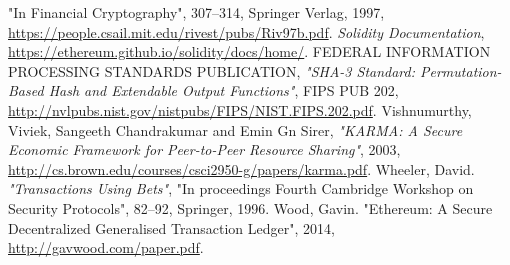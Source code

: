\documentclass[a4paper]{article}
\begin{document}
\begin{thebibliography}{9}
    "In Financial Cryptography", 307--314, Springer Verlag, 1997,
    \url{https://people.csail.mit.edu/rivest/pubs/Riv97b.pdf}.
 \textit{Solidity Documentation}, \url{https://ethereum.github.io/solidity/docs/home/}.
 FEDERAL INFORMATION PROCESSING STANDARDS PUBLICATION,
    \textit{"SHA-3 Standard: Permutation-Based Hash and Extendable Output Functions"}, FIPS PUB 202,
    \url{http://nvlpubs.nist.gov/nistpubs/FIPS/NIST.FIPS.202.pdf}.
 Vishnumurthy, Viviek, Sangeeth Chandrakumar and Emin Gn Sirer, \textit{"KARMA: A Secure
    Economic Framework for Peer-to-Peer Resource Sharing"}, 2003,
   \url{http://cs.brown.edu/courses/csci2950-g/papers/karma.pdf}.
 Wheeler, David. \textit{"Transactions Using Bets"},
    "In proceedings Fourth Cambridge Workshop on Security Protocols", 82--92, Springer, 1996.
 Wood, Gavin. "Ethereum: A Secure Decentralized Generalised Transaction Ledger", 2014,
    \url{http://gavwood.com/paper.pdf}.
\end{thebibliography}
\appendix
\end{document}
